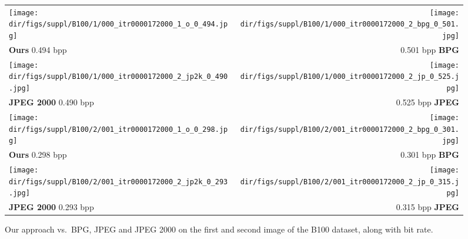 \begin{subappendices}
\begin{figure*}[!h]
\centering
\setlength{\tabcolsep}{1pt}
\begin{tabular}{lr}
    
\texttt{[image: \\dir/figs/suppl/B100/1/000\_itr0000172000\_1\_o\_0\_494.jpg]}&
\texttt{[image: \\dir/figs/suppl/B100/1/000\_itr0000172000\_2\_bpg\_0\_501.jpg]}\\[-0.5ex]
\textbf{Ours} 0.494 bpp & 0.501 bpp \textbf{BPG} \\
\texttt{[image: \\dir/figs/suppl/B100/1/000\_itr0000172000\_2\_jp2k\_0\_490.jpg]}&
\texttt{[image: \\dir/figs/suppl/B100/1/000\_itr0000172000\_2\_jp\_0\_525.jpg]}\\
\textbf{JPEG 2000} 0.490 bpp & 0.525 bpp \textbf{JPEG}
\\[0.5cm]
    
\texttt{[image: \\dir/figs/suppl/B100/2/001\_itr0000172000\_1\_o\_0\_298.jpg]}&
\texttt{[image: \\dir/figs/suppl/B100/2/001\_itr0000172000\_2\_bpg\_0\_301.jpg]}\\[-0.5ex]
\textbf{Ours} 0.298 bpp & 0.301 bpp \textbf{BPG} \\
\texttt{[image: \\dir/figs/suppl/B100/2/001\_itr0000172000\_2\_jp2k\_0\_293.jpg]}&
\texttt{[image: \\dir/figs/suppl/B100/2/001\_itr0000172000\_2\_jp\_0\_315.jpg]}\\
\textbf{JPEG 2000} 0.293 bpp & 0.315 bpp \textbf{JPEG}

\end{tabular}
\caption{\label{imgc:fig:vis_ex_B100_first}Our approach vs.\ BPG, JPEG and JPEG 2000 on the first and second image of the B100 dataset, along with bit rate.}
\end{figure*}

\FloatBarrier
\newpage


\end{subappendices}
